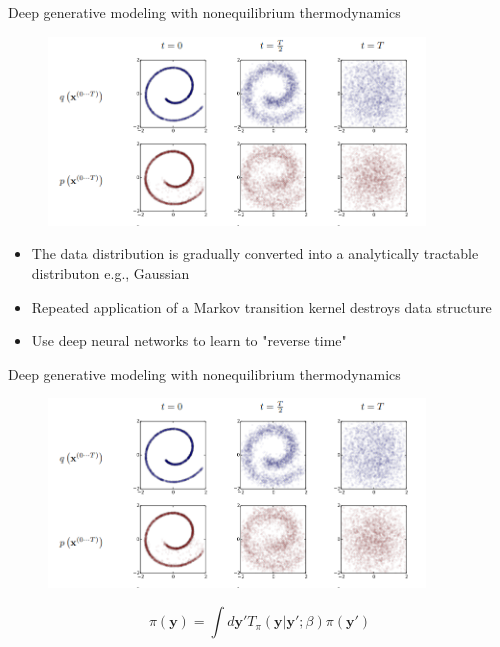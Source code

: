 \documentclass{beamer}					%
\begin{document}
\begin{frame}{Deep generative modeling with nonequilibrium thermodynamics}
\begin{figure}
\includegraphics[width=10cm]{Swiss.png}
\end{figure}
\begin{itemize}
\item The data distribution is gradually converted into a analytically tractable distributon e.g., Gaussian
\item Repeated application of a Markov transition kernel destroys data structure
\item Use deep neural networks to learn to "reverse time"
\end{itemize}
\end{frame}

\begin{frame}{Deep generative modeling with nonequilibrium thermodynamics}
\begin{figure}
\includegraphics[width=10cm]{Swiss.png}
\end{figure}
\begin{equation*}
\pi(\bm{y}) = \int d\bm{y}'T_{\pi}(\bm{y}|\bm{y}';\beta)\pi(\bm{y}')
\end{equation*}
\end{frame}
\end{document}
